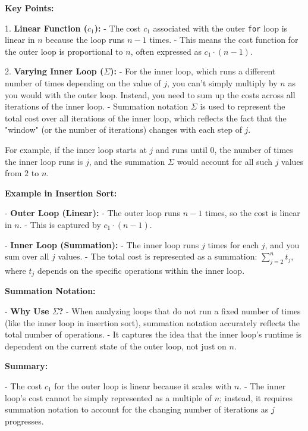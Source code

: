 \documentclass{article}
\begin{document}
\textbf{Key Points:}

1. \textbf{Linear Function ($c_1$):}
   - The cost $c_1$ associated with the outer \texttt{for} loop is linear in $n$ because the loop runs $n-1$ times.
   - This means the cost function for the outer loop is proportional to $n$, often expressed as $c_1 \cdot (n-1)$.

2. \textbf{Varying Inner Loop ($\Sigma$):}
   - For the inner loop, which runs a different number of times depending on the value of $j$, you can't simply multiply by $n$ as you would with the outer loop. Instead, you need to sum up the costs across all iterations of the inner loop.
   - Summation notation $\Sigma$ is used to represent the total cost over all iterations of the inner loop, which reflects the fact that the "window" (or the number of iterations) changes with each step of $j$.

   For example, if the inner loop starts at $j$ and runs until $0$, the number of times the inner loop runs is $j$, and the summation $\Sigma$ would account for all such $j$ values from $2$ to $n$.

\textbf{Example in Insertion Sort:}

- \textbf{Outer Loop (Linear):}
  - The outer loop runs $n-1$ times, so the cost is linear in $n$.
  - This is captured by $c_1 \cdot (n-1)$.

- \textbf{Inner Loop (Summation):}
  - The inner loop runs $j$ times for each $j$, and you sum over all $j$ values.
  - The total cost is represented as a summation: $\sum_{j=2}^{n} t_j$, where $t_j$ depends on the specific operations within the inner loop.

\textbf{Summation Notation:}

- \textbf{Why Use $\Sigma$?}
  - When analyzing loops that do not run a fixed number of times (like the inner loop in insertion sort), summation notation accurately reflects the total number of operations.
  - It captures the idea that the inner loop's runtime is dependent on the current state of the outer loop, not just on $n$.

\textbf{Summary:}

- The cost $c_1$ for the outer loop is linear because it scales with $n$.
- The inner loop's cost cannot be simply represented as a multiple of $n$; instead, it requires summation notation to account for the changing number of iterations as $j$ progresses.
\end{document}
